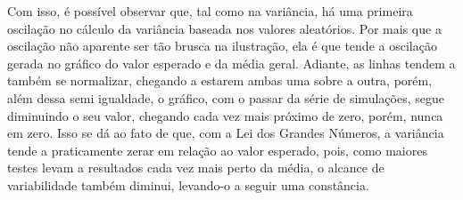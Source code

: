
Com isso, é possível observar que, tal como na variância, há uma primeira oscilação no cálculo da variância baseada nos valores aleatórios. Por mais que a oscilação não aparente ser tão brusca na ilustração, ela é que tende a oscilação gerada no gráfico do valor esperado e da média geral. Adiante, as linhas tendem a também se normalizar, chegando a estarem ambas uma sobre a outra, porém, além dessa semi igualdade, o gráfico, com o passar da série de simulações, segue diminuindo o seu valor, chegando cada vez mais próximo de zero, porém, nunca em zero. Isso se dá ao fato de que, com a Lei dos Grandes Números, a variância tende a praticamente zerar em relação ao valor esperado, pois, como maiores testes levam a resultados cada vez mais perto da média, o alcance de variabilidade também diminui, levando-o a seguir uma constância.

